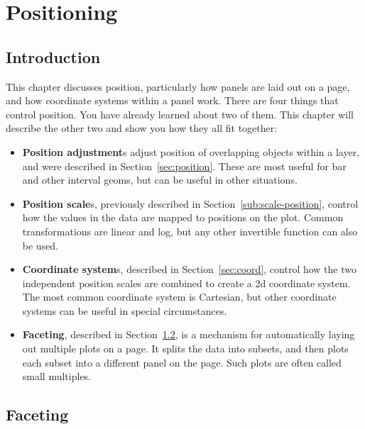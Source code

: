 
% 


\chapter{Positioning}
\label{cha:position}

\section{Introduction}

This chapter discusses position, particularly how panels are laid out on a page, and how coordinate systems within a panel work.  There are four things that control position.  You have already learned about two of them.  This chapter will describe the other two and show you how they all fit together:

\begin{itemize}
  \item {\bf Position adjustment}s adjust position of overlapping objects within a layer, and were described in Section~\ref{sec:position}.  These are most useful for bar and other interval geoms, but can be useful in other situations.

  \item {\bf Position scale}s, previously described in Section~\ref{sub:scale-position}, control how the values in the data are mapped to positions on the plot.  Common transformations are linear and log, but any other invertible function can also be used.

  \item {\bf Coordinate system}s, described in Section~\ref{sec:coord}, control how the two independent position scales are combined to create a 2d coordinate system.  The most common coordinate system is Cartesian, but other coordinate systems can be useful in special circumstances.

  \item {\bf Faceting}, described in Section~\ref{sec:faceting}, is a mechanism for automatically laying out multiple plots on a page.  It splits the data into subsets, and then plots each subset into a different panel on the page.  Such plots are often called small multiples.  
  
\end{itemize}

\section{Faceting}
\label{sec:faceting}

